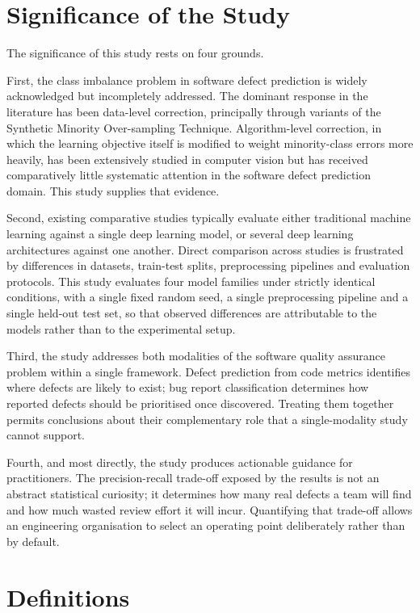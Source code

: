 \documentclass[12pt,a4paper,oneside]{report}
\begin{document}
\section{Significance of the Study}

The significance of this study rests on four grounds.

First, the class imbalance problem in software defect prediction is widely acknowledged but incompletely addressed. The dominant response in the literature has been data-level correction, principally through variants of the Synthetic Minority Over-sampling Technique. Algorithm-level correction, in which the learning objective itself is modified to weight minority-class errors more heavily, has been extensively studied in computer vision but has received comparatively little systematic attention in the software defect prediction domain. This study supplies that evidence.

Second, existing comparative studies typically evaluate either traditional machine learning against a single deep learning model, or several deep learning architectures against one another. Direct comparison across studies is frustrated by differences in datasets, train-test splits, preprocessing pipelines and evaluation protocols. This study evaluates four model families under strictly identical conditions, with a single fixed random seed, a single preprocessing pipeline and a single held-out test set, so that observed differences are attributable to the models rather than to the experimental setup.

Third, the study addresses both modalities of the software quality assurance problem within a single framework. Defect prediction from code metrics identifies where defects are likely to exist; bug report classification determines how reported defects should be prioritised once discovered. Treating them together permits conclusions about their complementary role that a single-modality study cannot support.

Fourth, and most directly, the study produces actionable guidance for practitioners. The precision-recall trade-off exposed by the results is not an abstract statistical curiosity; it determines how many real defects a team will find and how much wasted review effort it will incur. Quantifying that trade-off allows an engineering organisation to select an operating point deliberately rather than by default.

\section{Definitions}
\end{document}
